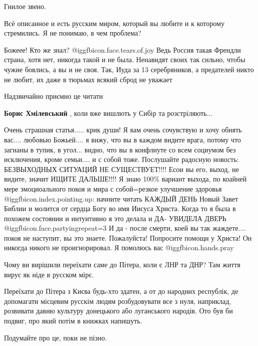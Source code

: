 \begin{itemize}
Гнилое звено.

Всё описанное и есть русским миром, который вы любите и к которому стремились. Я не понимаю, в чем проблема?


Божеее! Кто же знал?  @igg{fbicon.face.tears.of.joy}  Ведь Россия такая Френдли страна, хотя нет, никогда
такой и не была. Ненавидят своих так сильно, чтобы чужие боялись, а вы и не
своя. Так, Иуда за 13 серебряников, а предателей никто не любит, их даже в
тюрьмах всякий сброд не уважает

Надзвичайно приємно це читати

\begin{itemize} %
\textbf{Борис Хмілевський} , коли вже вишлють у Сибір та розстріляють...
\end{itemize} %


Очень страшная статья..... крик души! Я вам очень сочувствую и хочу обнять
вас.... любовью Божьей.... я вижу, что вы в каждом видите врага, потому что
загнаны в тупик, в угол... видно, что вы в конфлиуте со всем социумом без
исключения, кроме семьи.... и с собой тоже. Послушайте радосную новость:
БЕЗВЫХОДНЫХ СИТУАЦИЙ НЕ СУЩЕСТВУЕТ!!!! Есои вы его, выход, не видите, значит
ИЩИТЕ ДАЛЬШЕ!!!! Я знаю 100\% вариант выхода, по коайней мере эмоциоального
покоя и мира с собой=резкое улучшение здоровья @igg{fbicon.index.pointing.up}: начните читать КАЖДЫЙ ДЕНЬ
Новый Завет Библии и молится от сердца Богу во имя Иисуса Христа. Когда то я
была в похожем состоянии и интуитивно я это делала и ДА- УВИДЕЛА ДВЕРЬ  @igg{fbicon.face.partying}{repeat=3}  И
да - после смерти, коей вы так жаждете.... покоя не наступит, вы это знаете.
Пожалуйста! Попросите помощи у Христа! Он никогда никого не проигнорировал. Я
помолюсь вас  @igg{fbicon.hands.pray} 


Чому ви вирішили переїхати саме до Пітера, коли є ЛНР та ДНР? Там життя вирує
як ніде в русском мірє.

Переїхати до Пітера з Києва будь-хто здатен, а от до народних республік, де
допомагати місцевим русскім людям розбудовувати все з нуля, наприклад,
розвивати давню культуру донецького або луганського народів. Ото був би подвиг,
про який потім в книжках напишуть.

Подумайте про це, поки не пізно.


\end{itemize}

